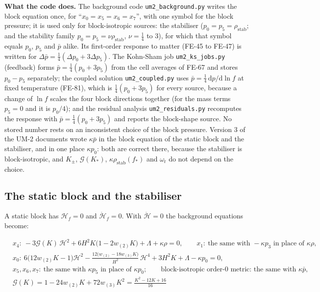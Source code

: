 \documentclass[
  10pt,
]{article}
\begin{document}
\textbf{What the code does.} The background code
\texttt{um2\_background.py} writes the block equation once, for
``\(x_0 = x_5 = x_6 = x_7\)'', with one symbol for the block pressure;
it is used only for block-isotropic sources: the stabiliser
(\(p_0 = p_5 = \rho_{\mathrm{stab}}\); and the stability family
\(p_0 = p_5 = \nu\rho_{\mathrm{stab}}\), \(\nu = \frac14\) to 3), for
which that symbol equals \(p_0\), \(p_5\) and \(\bar p\) alike. Its
first-order response to matter (FE-45 to FE-47) is written for
\(\Delta\bar p = \frac14(\Delta p_0 + 3\Delta p_5)\). The Kohn-Sham job
\texttt{um2\_ks\_jobs.py} (feedback) forms
\(\bar p = \frac14(p_0 + 3p_5)\) from the cell averages of FE-67 and
stores \(p_0 - p_5\) separately; the coupled solution
\texttt{um2\_coupled.py} uses
\(\bar p = \frac14\,\mathrm{d}p/\mathrm{d}\ln f\) at fixed temperature
(FE-81), which is \(\frac14(p_0 + 3p_5)\) for every source, because a
change of \(\ln f\) scales the four block directions together (for the
mass terms \(p_5 = 0\) and it is \(p_0/4\)); and the residual analysis
\texttt{um2\_residuals.py} recomputes the response with
\(\bar p = \frac14(p_0 + 3p_5)\) and reports the block-shape source. No
stored number rests on an inconsistent choice of the block pressure.
Version 3 of the UM-2 documents wrote \(\kappa\bar p\) in the block
equation of the static block and the stabiliser, and in one place
\(\kappa p_0\): both are correct there, because the stabiliser is
block-isotropic, and \(K_\pm\), \(\mathcal{G}(K_*)\),
\(\kappa\rho_{\mathrm{stab}}(f_*)\) and \(\omega_{\mathrm{r}}\) do not
depend on the choice.

\hypertarget{the-static-block-and-the-stabiliser}{%
\subsection{The static block and the
stabiliser}\label{the-static-block-and-the-stabiliser}}

A static block has \(\mathcal{H}_f = 0\) and
\(\dot{\mathcal{H}}_f = 0\). With \(\dot{\mathcal{H}} = 0\) the
background equations become:

\[
\begin{aligned}
&x_4:\ -3\mathcal{G}(K)\,\mathcal{H}^2 + 6H^2K\big(1 - 2w_{(2)}K\big) + \Lambda + \kappa\rho = 0,\qquad
 x_1:\ \text{the same with } -\kappa p_3 \text{ in place of } \kappa\rho,\\
&x_0:\ 6\big(12w_{(2)}K - 1\big)\mathcal{H}^2 - \frac{12\big(w_{(2)} -
 18w_{(3)}K\big)}{H^2}\,\mathcal{H}^4 + 3H^2K + \Lambda
 - \kappa p_0 = 0,\\
&x_5, x_6, x_7:\ \text{the same with } \kappa p_5 \text{ in place of } \kappa p_0;\qquad
 \text{block-isotropic order-0 metric: the same with } \kappa\bar p,\\
&\mathcal{G}(K) = 1 - 24w_{(2)}K + 72w_{(3)}K^2 = \frac{K^2 - 12K + 16}{16}
\end{aligned} \tag{FE-42}
\]
\end{document}
